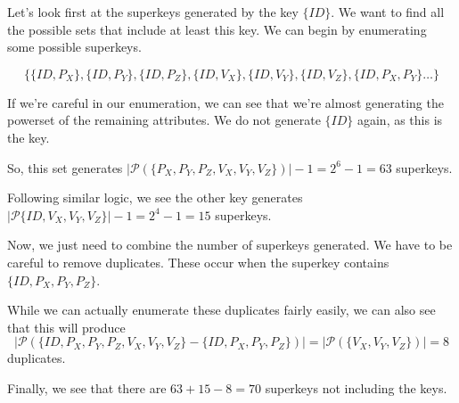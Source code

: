 \documentclass[12pt,letterpaper]{article}
\begin{document}
\begin{enumerate}
\begin{enumerate}
          Let's look first at the superkeys generated by the key $\{ID\}$.
          We want to find all the possible sets that include at least this key.
          We can begin by enumerating some possible superkeys.

          \[\{\{ID, P_X\}, \{ID, P_Y\}, \{ID, P_Z\}, \{ID, V_X\}, \{ID, V_Y\}, \{ID, V_Z\}, \{ID, P_X, P_Y\} \dots \}\]

          If we're careful in our enumeration, we can see that we're almost generating the powerset of the remaining attributes.
          We do not generate $\{ID\}$ again, as this is the key.

          So, this set generates $|\mathcal{P}\left(\{P_X, P_Y, P_Z, V_X, V_Y, V_Z\}\right)| - 1 = 2^6 - 1 = 63$ superkeys.

          Following similar logic, we see the other key generates $|\mathcal{P}\{ID, V_X, V_Y, V_Z\}| - 1 = 2^4 - 1 = 15$ superkeys.

          Now, we just need to combine the number of superkeys generated.
          We have to be careful to remove duplicates.
          These occur when the superkey contains $\{ID, P_X, P_Y, P_Z\}$.

          While we can actually enumerate these duplicates fairly easily,
          we can also see that this will produce
          \[|\mathcal{P}\left(\{ID, P_X, P_Y, P_Z, V_X, V_Y, V_Z\} - \{ID, P_X, P_Y, P_Z\}\right)| = |\mathcal{P}\left(\{V_X, V_Y, V_Z\}\right)| = 8\]
          duplicates.

          Finally, we see that there are $63 + 15 - 8 = 70$ superkeys not including the keys.
      \end{enumerate}
  \end{enumerate}
\end{document}

